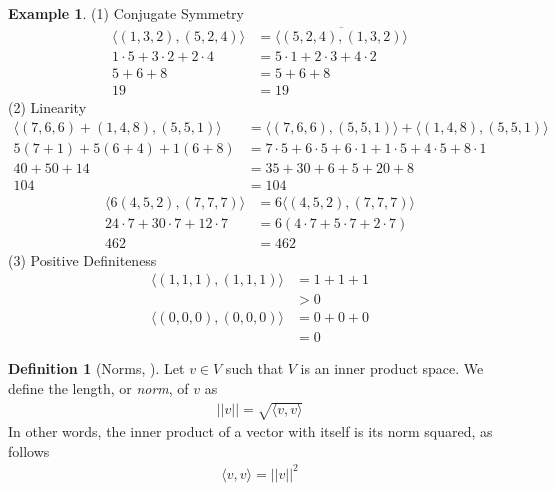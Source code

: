 \documentclass[11pt,reqno]{amsart}
\theoremstyle{plain}
\theoremstyle{definition}
\newtheorem{example}[theorem]{Example}
\newtheorem{definition}[theorem]{Definition}
\begin{document}
{\begin{example}
    (1) Conjugate Symmetry
    \begin{align*}
        \langle (1, 3, 2), (5, 2, 4)\rangle &= \overline{\langle (5, 2, 4), (1, 3, 2)\rangle}\\
        1\cdot 5 + 3\cdot 2 + 2\cdot 4 &= 5\cdot 1 + 2\cdot 3 + 4\cdot 2\\
        5 + 6 + 8 &= 5 + 6 + 8\\
        19 &= 19
    \end{align*}
    (2) Linearity
    \begin{align*}
        \langle (7, 6, 6) + (1, 4, 8), (5, 5, 1)\rangle &= \langle (7, 6, 6),(5, 5, 1)\rangle + \langle (1, 4, 8),(5, 5, 1)\rangle\\
        5(7+1) + 5(6+4) + 1(6+8) &= 7\cdot 5 + 6\cdot 5 + 6\cdot 1 + 1\cdot 5 + 4\cdot 5 + 8\cdot 1\\
        40 + 50 + 14 &= 35 + 30 + 6 + 5 + 20 + 8\\
        104 &= 104
    \end{align*}
    \begin{align*}
        \langle6(4, 5, 2),(7, 7, 7)\rangle &= 6\langle(4,5,2),(7,7,7)\rangle\\
        24\cdot 7 + 30\cdot 7 + 12\cdot 7 &= 6(4\cdot 7 + 5\cdot 7 + 2\cdot 7)\\
        462 &= 462
    \end{align*}
    (3) Positive Definiteness
    \begin{align*}
        \langle (1, 1, 1), (1, 1, 1)\rangle &= 1 + 1 + 1\\
        &> 0
    \end{align*}
    \begin{align*}
        \langle (0,0,0),(0,0,0)\rangle &= 0 + 0 + 0\\
        &= 0
    \end{align*}
\end{example}
\smallskip
\begin{definition}[{Norms, \cite{nimark}}]
    Let $v\in V$ such that $V$ is an inner product space. We define the length, or \emph{norm}, of $v$ as
    \begin{align*}
        ||v|| = \sqrt{\langle v,v\rangle}
    \end{align*}
    In other words, the inner product of a vector with itself is its norm squared, as follows
    \begin{align*}
        \langle v,v\rangle = ||v||^2
    \end{align*}
\end{definition}
}
\end{document}
